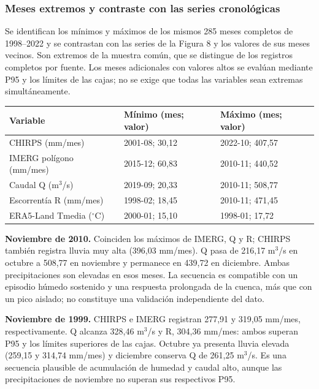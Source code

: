 \documentclass[10pt,a4paper]{article}
\begin{document}
\subsubsection*{Meses extremos y contraste con las series cronológicas}
Se identifican los mínimos y máximos de los mismos 285 meses completos de 1998--2022 y se contrastan con las series de la Figura 8 y los valores de sus meses vecinos. Son extremos de la muestra común, que se distingue de los registros completos por fuente. Los meses adicionales con valores altos se evalúan mediante P95 y los límites de las cajas; no se exige que todas las variables sean extremas simultáneamente.

\begin{center}
{\small
\begin{center}
\begin{tabular}{lll}
\toprule
Variable & Mínimo (mes; valor) & Máximo (mes; valor) \\
\midrule
CHIRPS (mm/mes) & 2001-08; 30,12 & 2022-10; 407,57 \\
IMERG polígono (mm/mes) & 2015-12; 60,83 & 2010-11; 440,52 \\
Caudal Q (m$^3$/s) & 2019-09; 20,33 & 2010-11; 508,77 \\
Escorrentía R (mm/mes) & 1998-02; 18,45 & 2010-11; 471,45 \\
ERA5-Land Tmedia ($^\circ$C) & 2000-01; 15,10 & 1998-01; 17,72 \\
\bottomrule
\end{tabular}
\end{center}
}
\end{center}

\textbf{Noviembre de 2010.} Coinciden los máximos de IMERG, Q y R; CHIRPS también registra lluvia muy alta (396,03 mm/mes). Q pasa de 216,17 m$^3$/s en octubre a 508,77 en noviembre y permanece en 439,72 en diciembre. Ambas precipitaciones son elevadas en esos meses. La secuencia es compatible con un episodio húmedo sostenido y una respuesta prolongada de la cuenca, más que con un pico aislado; no constituye una validación independiente del dato.

\textbf{Noviembre de 1999.} CHIRPS e IMERG registran 277,91 y 319,05 mm/mes, respectivamente. Q alcanza 328,46 m$^3$/s y R, 304,36 mm/mes: ambos superan P95 y los límites superiores de las cajas. Octubre ya presenta lluvia elevada (259,15 y 314,74 mm/mes) y diciembre conserva Q de 261,25 m$^3$/s. Es una secuencia plausible de acumulación de humedad y caudal alto, aunque las precipitaciones de noviembre no superan sus respectivos P95.
\end{document}
